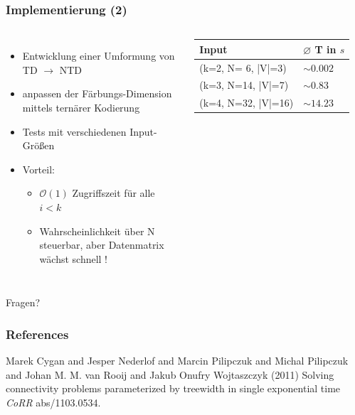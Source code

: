 \documentclass{beamer}
\begin{document}

\begin{frame}
\frametitle{Implementierung (2)}
\begin{columns}[c] %

\begin{itemize}
\item Entwicklung einer Umformung von TD $\rightarrow$ NTD
\item anpassen der Färbungs-Dimension mittels ternärer Kodierung
\item Tests mit verschiedenen Input-Größen
\item Vorteil:
\begin{itemize}
\item  $\mathcal{O}(1)$ Zugriffszeit für alle $i<k$
\item Wahrscheinlichkeit über N steuerbar, aber Datenmatrix wächst schnell !
\end{itemize}
\end{itemize}


\begin{table}
\begin{tabular}{l | l}
\toprule
\textbf{Input} & \textbf{ $\varnothing$ T in $s$}\\
\midrule
(k=2, N= 6, |V|=3) & $ \sim 0.002$ \\
(k=3, N=14, |V|=7) & $ \sim 0.83$ \\
(k=4, N=32, |V|=16) & $ \sim 14.23$ \\
\bottomrule
\end{tabular}
\end{table}
\end{columns}
\end{frame}


\begin{frame}
\Huge{\centerline{Fragen?}}
\end{frame}


\begin{frame}
\frametitle{References}
\footnotesize{
\begin{thebibliography}{99} %
 Marek Cygan and Jesper Nederlof and Marcin Pilipczuk and Michal Pilipczuk and Johan M. M. van Rooij and  Jakub Onufry Wojtaszczyk (2011)
\newblock Solving connectivity problems parameterized by treewidth in single exponential time
\newblock \emph{CoRR} abs/1103.0534.
\end{thebibliography}
}
\end{frame}
\end{document}
